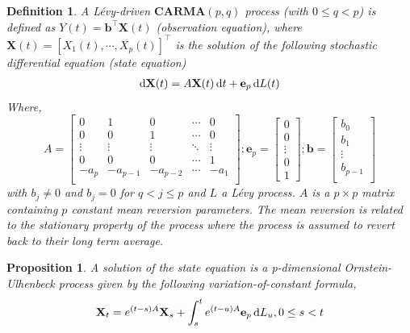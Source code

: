 \documentclass[10pt,a4paper,reqno]{amsart}
\newtheorem{definition}[theorem]{Definition}
\newtheorem{proposition}[theorem]{Proposition}
\theoremstyle{example}
\newcommand*\D{\mathop{}\!\textnormal{d}}
\begin{document}
 \begin{definition}
 A Lévy-driven $\textbf{CARMA}(p,q)$ process (with $0\leq q< p$) is defined as $Y (t) = \mathbf{b}^{\intercal}\textbf{X}(t)$ (observation equation), where $\textbf{X}(t)=[X_1(t),\cdots,X_p(t)]^{\intercal}$ is the solution of the following stochastic differential equation (state equation) 
 \begin{align}
\D\textbf{X}(t) = A\textbf{X}(t)\D t + \textbf{e}_p\D L(t)
 \end{align}
Where,  
$$
A=\begin{bmatrix}
0 & 1 & 0 & \cdots & 0 \\
0 & 0 & 1 & \cdots & 0 \\
\vdots & \vdots & \vdots & \ddots & \vdots \\
0 & 0 & 0 & \cdots & 1 \\
-a_p & -a_{p-1} &  -a_{p-2} &\cdots & -a_1 \\
\end{bmatrix} ;
\textbf{e}_p=\begin{bmatrix}
0 \\
0 \\
\vdots \\
0\\
1
\end{bmatrix};
\mathbf{b} = \begin{bmatrix}
b_0 \\
b_1 \\
\vdots\\
b_{p-1} \\
\end{bmatrix}
$$
\newline\newline
with $b_j\neq0$ and $b_j=0$ for $q<j\leq p$ and $L$ a Lévy process. $A$ is a $p \times p$ matrix containing $p$ constant mean reversion parameters. The mean reversion is related to the stationary property of the process where the process is assumed to revert back to their long term average. 
 \end{definition}
\noindent
\begin{proposition}
    A solution of the state equation is a p-dimensional Ornstein-Ulhenbeck process given by the following variation-of-constant formula,
    \begin{align}
         \textbf{X}_t = e^{(t-s)A}\textbf{X}_s + \int_s^t e^{(t-u)A}\textbf{e}_p\D L_u, 0 \leq s<t
    \end{align}
\end{proposition}
\noindent
\end{document}
